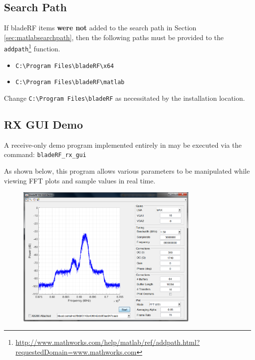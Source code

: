 {\subsection{\matlab Search Path}

If bladeRF items \textbf{were not} added to the \matlab search path in Section
\ref{sec:matlabsearchpath}, then the following paths must be provided to
the \texttt{addpath}\footnote{\url{http://www.mathworks.com/help/matlab/ref/addpath.html?requestedDomain=www.mathworks.com}} function.

\begin{itemize}
  \item \texttt{C:\textbackslash Program Files\textbackslash bladeRF\textbackslash x64}
  \item \texttt{C:\textbackslash Program Files\textbackslash bladeRF\textbackslash matlab}
\end{itemize}

Change \texttt{C:\textbackslash Program Files\textbackslash bladeRF} as necessitated by the installation location.

\newpage
\subsection{RX GUI Demo}
A receive-only demo program implemented entirely in \matlab may be executed via the command: \texttt{bladeRF\_rx\_gui}

As shown below, this program allows various parameters to be manipulated while viewing FFT plots and sample values in real time.

\begin{figure}[h]
  \centering
  \includegraphics[width=3.5in]{images/windows/matlab/rxgui-freq.png}
\end{figure}

}
